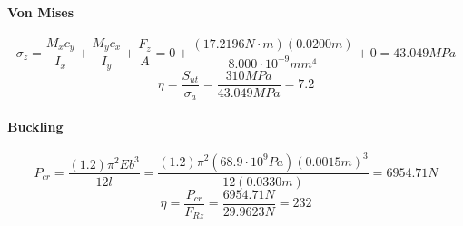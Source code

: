 \documentclass[../main.tex]{subfiles}
\begin{document}
\paragraph*{Von Mises}
$$\sigma_{z}={\frac{M_{x}c_y}{I_x}}+{\frac{M_{y}c_x}{I_y}}+{\frac{F_z}{A}}=0+\frac{(17.2196N\cdot{}m)(0.0200m)}{8.000\cdot{}10^{-9}mm^4}+0 = 43.049MPa$$
$$\eta = \dfrac{S_{ut}}{\sigma _a} = \dfrac{310MPa}{43.049MPa}=7.2$$
\paragraph*{Buckling}
$$P_{cr} = \frac{(1.2)\pi^2Eb^3}{12l}=\frac{(1.2)\pi^2(68.9\cdot{}10^9Pa)(0.0015m)^3}{12(0.0330m)}=6954.71N$$
$$\eta = \frac{P_{cr}}{F_{Rz}} = \frac{6954.71N}{29.9623N} = 232$$
\end{document}

